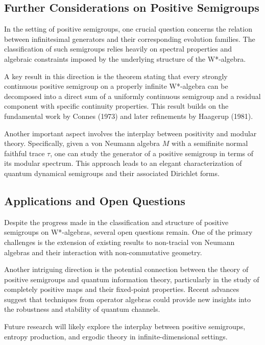 \documentclass{article}
\begin{document}
\subsection{Further Considerations on Positive Semigroups}
\label{subsec:d2-1.2}

In the setting of positive semigroups, one crucial question concerns the relation between infinitesimal generators and their corresponding evolution families. The classification of such semigroups relies heavily on spectral properties and algebraic constraints imposed by the underlying structure of the W*-algebra.

A key result in this direction is the theorem stating that every strongly continuous positive semigroup on a properly infinite W*-algebra can be decomposed into a direct sum of a uniformly continuous semigroup and a residual component with specific continuity properties. This result builds on the fundamental work by Connes (1973) and later refinements by Haagerup (1981).

Another important aspect involves the interplay between positivity and modular theory. Specifically, given a von Neumann algebra $M$ with a semifinite normal faithful trace $\tau$, one can study the generator of a positive semigroup in terms of its modular spectrum. This approach leads to an elegant characterization of quantum dynamical semigroups and their associated Dirichlet forms.

\subsection{Applications and Open Questions}
\label{subsec:d2-1.3}

Despite the progress made in the classification and structure of positive semigroups on W*-algebras, several open questions remain. One of the primary challenges is the extension of existing results to non-tracial von Neumann algebras and their interaction with non-commutative geometry.

Another intriguing direction is the potential connection between the theory of positive semigroups and quantum information theory, particularly in the study of completely positive maps and their fixed-point properties. Recent advances suggest that techniques from operator algebras could provide new insights into the robustness and stability of quantum channels.

Future research will likely explore the interplay between positive semigroups, entropy production, and ergodic theory in infinite-dimensional settings.

\end{document}
